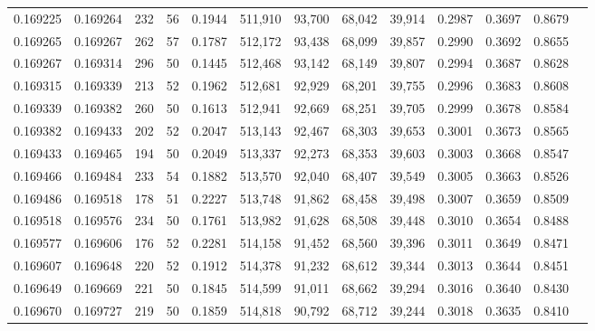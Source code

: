\begin{tabular}{rrrrrrrrrrrrr}
0.169225 & 0.169264 &   232 &  56 &                                     0.1944 & 511,910 &  93,700 &  68,042 &  39,914 & 0.2987 & 0.3697 & 0.8679 \\
0.169265 & 0.169267 &   262 &  57 &                                     0.1787 & 512,172 &  93,438 &  68,099 &  39,857 & 0.2990 & 0.3692 & 0.8655 \\
0.169267 & 0.169314 &   296 &  50 &                                     0.1445 & 512,468 &  93,142 &  68,149 &  39,807 & 0.2994 & 0.3687 & 0.8628 \\
0.169315 & 0.169339 &   213 &  52 &                                     0.1962 & 512,681 &  92,929 &  68,201 &  39,755 & 0.2996 & 0.3683 & 0.8608 \\
0.169339 & 0.169382 &   260 &  50 &                                     0.1613 & 512,941 &  92,669 &  68,251 &  39,705 & 0.2999 & 0.3678 & 0.8584 \\
0.169382 & 0.169433 &   202 &  52 &                                     0.2047 & 513,143 &  92,467 &  68,303 &  39,653 & 0.3001 & 0.3673 & 0.8565 \\
0.169433 & 0.169465 &   194 &  50 &                                     0.2049 & 513,337 &  92,273 &  68,353 &  39,603 & 0.3003 & 0.3668 & 0.8547 \\
0.169466 & 0.169484 &   233 &  54 &                                     0.1882 & 513,570 &  92,040 &  68,407 &  39,549 & 0.3005 & 0.3663 & 0.8526 \\
0.169486 & 0.169518 &   178 &  51 &                                     0.2227 & 513,748 &  91,862 &  68,458 &  39,498 & 0.3007 & 0.3659 & 0.8509 \\
0.169518 & 0.169576 &   234 &  50 &                                     0.1761 & 513,982 &  91,628 &  68,508 &  39,448 & 0.3010 & 0.3654 & 0.8488 \\
0.169577 & 0.169606 &   176 &  52 &                                     0.2281 & 514,158 &  91,452 &  68,560 &  39,396 & 0.3011 & 0.3649 & 0.8471 \\
0.169607 & 0.169648 &   220 &  52 &                                     0.1912 & 514,378 &  91,232 &  68,612 &  39,344 & 0.3013 & 0.3644 & 0.8451 \\
0.169649 & 0.169669 &   221 &  50 &                                     0.1845 & 514,599 &  91,011 &  68,662 &  39,294 & 0.3016 & 0.3640 & 0.8430 \\
0.169670 & 0.169727 &   219 &  50 &                                     0.1859 & 514,818 &  90,792 &  68,712 &  39,244 & 0.3018 & 0.3635 & 0.8410 \\

\end{tabular}
